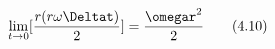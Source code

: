 \begin{equation*}
\lim_{t \rightarrow 0}[\frac{r(r\omega\Deltat)}{2}] = \frac{\omegar^{2}}{2} \tag{4.10}
\end{equation*}
